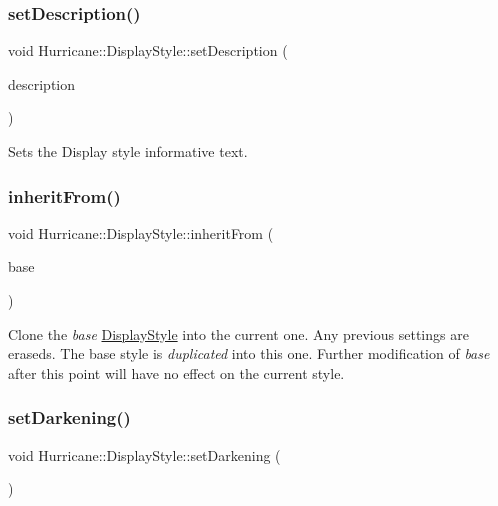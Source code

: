 \subsubsection{\texorpdfstring{set\+Description()}{setDescription()}}
{\footnotesize\ttfamily void Hurricane\+::\+Display\+Style\+::set\+Description (\begin{DoxyParamCaption}\item[{const std\+::string \&}]{description }\end{DoxyParamCaption})\hspace{0.3cm}{\ttfamily [inline]}}

Sets the Display style informative text. \mbox{\label{classHurricane_1_1DisplayStyle_a603dbd5d6973a8897a85513acdfda2d0}} 
\subsubsection{\texorpdfstring{inherit\+From()}{inheritFrom()}}
{\footnotesize\ttfamily void Hurricane\+::\+Display\+Style\+::inherit\+From (\begin{DoxyParamCaption}\item[{const \hyperlink{classHurricane_1_1DisplayStyle}{Display\+Style} $\ast$}]{base }\end{DoxyParamCaption})}

Clone the {\itshape base} \hyperlink{classHurricane_1_1DisplayStyle}{Display\+Style} into the current one. Any previous settings are eraseds. The base style is {\itshape duplicated} into this one. Further modification of {\itshape base} after this point will have no effect on the current style. \mbox{\label{classHurricane_1_1DisplayStyle_ab17b746af2c529c62a902d0cb992be34}} 
\subsubsection{\texorpdfstring{set\+Darkening()}{setDarkening()}}
{\footnotesize\ttfamily void Hurricane\+::\+Display\+Style\+::set\+Darkening (\begin{DoxyParamCaption}\item[{const H\+S\+Vr \&}]{ }\end{DoxyParamCaption})}

